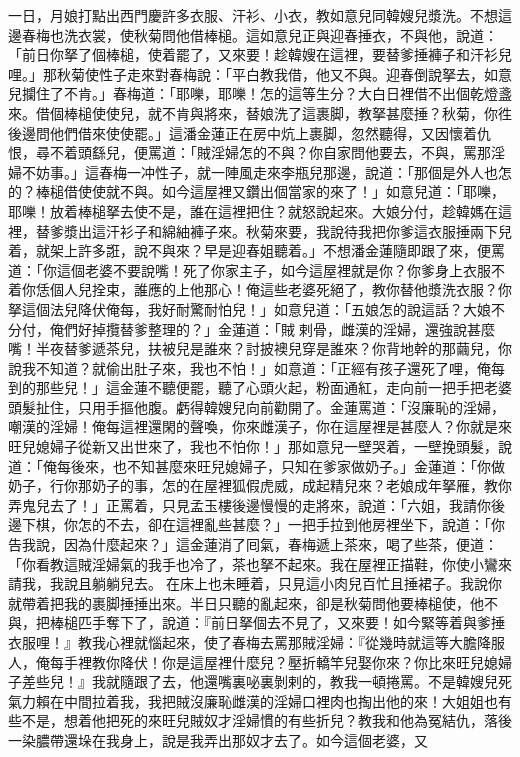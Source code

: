 一日，月娘打點出西門慶許多衣服、汗衫、小衣，教如意兒同韓嫂兒漿洗。不想這邊春梅也洗衣裳，使秋菊問他借棒槌。這如意兒正與迎春捶衣，不與他，說道：「前日你拏了個棒槌，使着罷了，又來要！{}趁韓嫂在這裡，要替爹捶褲子和汗衫兒哩。」那秋菊使性子走來對春梅說：「平白教我借，他又不與。迎春倒說拏去，如意兒攔住了不肯。」春梅道：「耶嚛，耶嚛！怎的這等生分？大白日裡借不出個乾燈盞來。借個棒槌使使兒，就不肯與將來，替娘洗了這裹脚，教拏甚麼捶？秋菊，你徃後邊問他們借來使使罷。」這潘金蓮正在房中炕上裹脚，忽然聽得，又因懷着仇恨，尋不着頭繇兒，便罵道：「賊淫婦怎的不與？你自家問他要去，不與，罵那淫婦不妨事。」這春梅一冲性子，就一陣風走來李瓶兒那邊，說道：「那個是外人也怎的？棒槌借使使就不與。如今這屋裡又鑽出個當家的來了！」{}如意兒道：「耶嚛，耶嚛！放着棒槌拏去使不是，誰在這裡把住？就怒說起來。大娘分付，趁韓媽在這裡，替爹漿出這汗衫子和綿紬褲子來。秋菊來要，我說待我把你爹這衣服捶兩下兒着，就架上許多誑，說不與來？早是迎春姐聽着。」{}不想潘金蓮隨即跟了來，便罵道：「你這個老婆不要說嘴！死了你家主子，如今這屋裡就是你？你爹身上衣服不着你恁個人兒拴束，誰應的上他那心！俺這些老婆死絕了，教你替他漿洗衣服？你拏這個法兒降伏俺每，我好耐驚耐怕兒！」如意兒道：「五娘怎的說這話？大娘不分付，俺們好掉攬替爹整理的？」金蓮道：「賊𢱉剌骨，雌漢的淫婦，還強說甚麼嘴！半夜替爹遞茶兒，扶被兒是誰來？{}討披襖兒穿是誰來？你背地幹的那繭兒，你說我不知道？就偷出肚子來，我也不怕！」{}如意道：「正經有孩子還死了哩，俺每到的那些兒！」{}這金蓮不聽便罷，聽了心頭火起，粉面通紅，走向前一把手把老婆頭髮扯住，只用手摳他腹。{}虧得韓嫂兒向前勸開了。金蓮罵道：「沒廉恥的淫婦，嘲漢的淫婦！俺每這裡還閑的聲喚，你來雌漢子，你在這屋裡是甚麼人？你就是來旺兒媳婦子從新又出世來了，{}我也不怕你！」那如意兒一壁哭着，一壁挽頭髮，{}說道：「俺每後來，也不知甚麼來旺兒媳婦子，只知在爹家做奶子。」金蓮道：「你做奶子，行你那奶子的事，怎的在屋裡狐假虎威，成起精兒來？老娘成年拏雁，教你弄鬼兒去了！」正罵着，只見孟玉樓後邊慢慢的走將來，說道：「六姐，我請你後邊下棋，你怎的不去，卻在這裡亂些甚麼？」一把手拉到他房裡坐下，說道：「你告我說，因為什麼起來？」這金蓮消了囘氣，春梅遞上茶來，喝了些茶，便道：「你看教這賊淫婦氣的我手也冷了，茶也拏不起來。我在屋裡正描鞋，你使小鸞來請我，我說且躺躺兒去。𢱉在床上也未睡着，只見這小肉兒百忙且捶裙子。我說你就帶着把我的裹脚捶捶出來。半日只聽的亂起來，卻是秋菊問他要棒槌使，他不與，把棒槌匹手奪下了，{}說道：『前日拏個去不見了，又來要！如今緊等着與爹捶衣服哩！』教我心裡就惱起來，使了春梅去罵那賊淫婦：『從幾時就這等大膽降服人，俺每手裡教你降伏！你是這屋裡什麼兒？壓折轎竿兒娶你來？你比來旺兒媳婦子差些兒！』我就隨跟了去，他還嘴裏咇裏剝剌的，教我一頓捲罵。{}不是韓嫂兒死氣力賴在中間拉着我，我把賊沒廉恥雌漢的淫婦口裡肉也掏出他的來！大姐姐也有些不是，想着他把死的來旺兒賊奴才淫婦慣的有些折兒？教我和他為冤結仇，落後一染膿帶還垛在我身上，說是我弄出那奴才去了。如今這個老婆，又